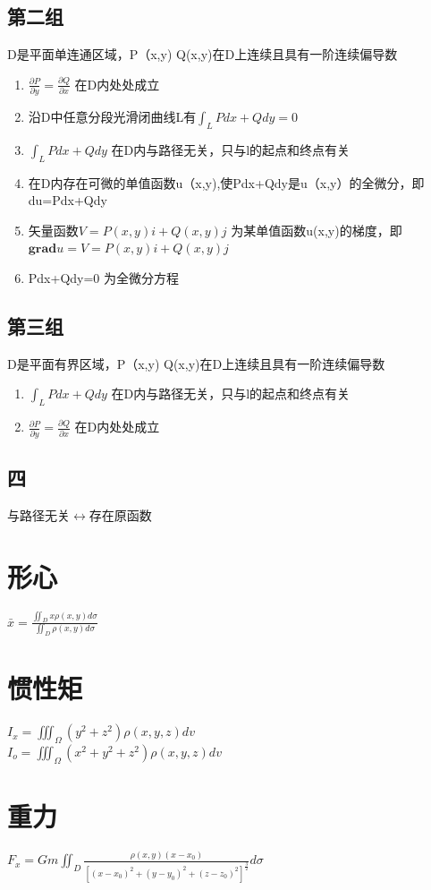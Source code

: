 \documentclass[UTF8]{ctexart}
\begin{document}
\subsection{第二组}
D是平面单连通区域，P（x,y) Q(x,y)在D上连续且具有一阶连续偏导数
\begin{enumerate}
  \item $\frac{\partial P}{\partial y}=\frac{\partial Q}{\partial x}$ 在D内处处成立
  \item 沿D中任意分段光滑闭曲线L有$\int_L Pdx+Qdy=0 $
  \item $\int_L Pdx+Qdy $ 在D内与路径无关，只与l的起点和终点有关
  \item 在D内存在可微的单值函数u（x,y),使Pdx+Qdy是u（x,y）的全微分，即du=Pdx+Qdy
  \item 矢量函数$V=P(x,y)\mathit{i}+Q(x,y)\mathit{j}$ 为某单值函数u(x,y)的梯度，即 $\mathbf{grad}u=V=P(x,y)\mathit{i}+Q(x,y)\mathit{j}$
  \item Pdx+Qdy=0 为全微分方程
\end{enumerate}
\subsection{第三组}
D是平面有界区域，P（x,y) Q(x,y)在D上连续且具有一阶连续偏导数
\begin{enumerate}
  \item $\int_L Pdx+Qdy $ 在D内与路径无关，只与l的起点和终点有关
  \item $\frac{\partial P}{\partial y}=\frac{\partial Q}{\partial x}$ 在D内处处成立
\end{enumerate}
\subsection{四}
与路径无关$\longleftrightarrow$存在原函数

\section{形心}
$\bar{x}=\frac{\iint_D x \rho(x,y) d\sigma}{\iint_D \rho(x,y)d\sigma}$ \\
\section{惯性矩}
$I_x= \iiint_\Omega (y^2+z^2) \rho(x,y,z) dv$ \\
$I_o =\iiint_\Omega (x^2+y^2+z^2) \rho(x,y,z) dv $
\section{重力}
$F_x=Gm \iint_D \frac{\rho(x,y)(x-x_0)}{{[{(x-x_0)}^2+{(y-y_0)}^2+{(z-z_0)}^2]}^\frac{3}{2}} d\sigma $
\end{document}
